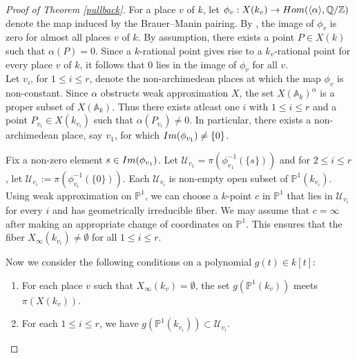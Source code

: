 \documentclass[11pt]{amsart}
\theoremstyle{plain}
\theoremstyle{definition}
\newcommand{\Hom}{{\rm Hom}}
\newcommand{\im}{{\rm Im}}
\newcommand{\A}{{\mathbb A}}
\renewcommand{\P}{{\mathbb P}}
\newcommand{\Q}{{\mathbb Q}}
\newcommand{\Z}{{\mathbb Z}}
\begin{document}
\begin{proof}[{Proof of Theorem \ref{pullback}}]
     For a place \(v\) of \(k\), let $\phi_v: X(k_v) \to \Hom(\langle \alpha \rangle, \Q/\Z)$ denote the map induced by the Brauer--Manin pairing. By \cite[Prop 13.3.1]{BG}, the image of \(\phi_v\) is zero for almost all places $v$ of $k$. By assumption, there exists a point \(P \in X(k)\) such that \(\alpha(P)=0\). Since a \(k\)-rational point gives rise to a \(k_v\)-rational point for every place \(v\) of \(k\), it follows that \(0\) lies in the image of \(\phi_v\) for all \(v\). \\
     Let $v_i$, for  $1 \leq i \leq r$, denote the non-archimedean places  at which the map $\phi_v $ is non-constant. Since \(\alpha\) obstructs weak approximation \(X\), the set \(X(\mathbb{A}_k)^{\alpha}\) is a proper subset of \(X(\A_k)\). Thus there exists atleast one \(i\) with \(1 \leq i \leq r\) and a point \(P_{v_i} \in X(k_{v_i})\) such that \(\alpha(P_{v_i})\neq 0\). In particular, there exists a non-archimedean place, say \(v_1\), for which \(\im(\phi_{v_1}) \neq \{0\}\).
     
     Fix a non-zero element \(s \in \im(\phi_{v_1})\). Let $\mathcal{U}_{v_1}= \pi(\phi_{v_1}^{-1}(\{s\}))$ and for $2 \leq i \leq r$, let $\mathcal{U}_{v_i} := \pi(\phi_{v_i}^{-1}(\{0\}))$. Each \( \mathcal{U}_{v_i}\) is non-empty open subset of $\P^1(k_{v_i})$. Using weak approximation on \(\P^1\), we can choose a \( k \)-point $c$ in \(\mathbb{P}^1\) that lies in \( \mathcal{U}_{v_i} \) for every \( i \) and has geometrically irreducible fiber. We may assume that \( c = \infty \) after making an appropriate change of coordinates on \(\mathbb{P}^1\). This ensures that the fiber \( X_\infty(k_{v_i}) \neq \emptyset \) for all \( 1 \leq i \leq r \). 

     Now we consider the following conditions on a polynomial $g(t) \in k[t]$:
\begin{enumerate}[label=\arabic*.]
    
      \item For each place \(v \) such that \( {X}_{\infty}(k_v) = \emptyset \), the set \( g(\P^1(k_v)) \) meets \( {\pi}({X}(k_v)) \). 
    \item For each \(1 \leq i \leq r \), we have \( g(\P^1(k_{v_i})) \subset \mathcal{U}_{v_i} \).
    

\end{enumerate}
\end{proof}
\end{document}
